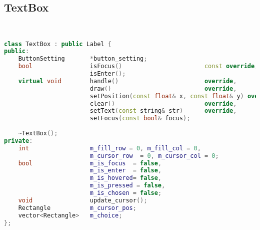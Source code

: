 \subsection{TextBox}
\begin{lstlisting}[language=C++]


class TextBox : public Label {
public:
    ButtonSetting       *button_setting;
    bool                isFocus()                       const override,
                        isEnter();
    virtual void        handle()                        override,
                        draw()                          override,
                        setPosition(const float& x, const float& y) override,
                        clear()                         override,
                        setText(const string& str)      override,
                        setFocus(const bool& focus);
    
    ~TextBox();
private:
    int                 m_fill_row = 0, m_fill_col = 0,
                        m_cursor_row  = 0, m_cursor_col = 0;
    bool                m_is_focus  = false,
                        m_is_enter  = false,
                        m_is_hovered= false,
                        m_is_pressed = false,
                        m_is_chosen = false;
    void                update_cursor();
    Rectangle           m_cursor_pos;
    vector<Rectangle>   m_choice;
};





\end{lstlisting}
